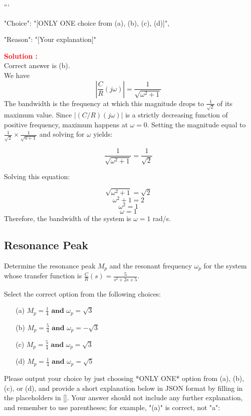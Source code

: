 \documentclass[12pt]{article}
\begin{document}
```
{

"Choice": "[ONLY ONE choice from (a), (b), (c), (d)]",

"Reason": "[Your explanation]"

}


\textbf{\textcolor{red}{Solution :}} \\
Correct answer is (b).\\
We have
\begin{equation}
    \left|\frac{C}{R}(j\omega)\right| = \frac{1}{\sqrt{\omega^2+1}}
\end{equation}
The bandwidth is the frequency at which this magnitude drops to \(\frac{1}{\sqrt{2}}\) of its maximum value. Since  \(|(C/R)(j\omega)|\) is a strictly decreasing function of positive frequency,  maximum happens at \(\omega = 0\). Setting the magnitude equal to \(\frac{1}{\sqrt{2}} \times \frac{1}{\sqrt{0+1}} \) and solving for \(\omega\) yields:

\[ \frac{1}{\sqrt{\omega^2 + 1}} = \frac{1}{\sqrt{2}} \]

Solving this equation:

\[ \sqrt{\omega^2 + 1} = \sqrt{2} \]
\[ \omega^2 + 1 = 2 \]
\[ \omega^2 = 1 \]
\[ \omega = 1 \]
Therefore, the bandwidth of the system is \(\omega = 1\) rad/s.
\clearpage

\subsection{Resonance Peak}

Determine the resonance peak \(M_p\) and the resonant frequency \(\omega_p\) for the system whose transfer function is \(\frac{C}{R}(s) = \frac{5}{s^2 + 2s + 5}\).


Select the correct option from the following choices:
\begin{enumerate}
    \item [(a)] \( M_p=\frac{1}{4} \textbf{ and } \omega_p= \sqrt{3} \)
    \item [(b)] \( M_p= \frac{5}{4} \textbf{ and } \omega_p= -\sqrt{3} \)
    \item [(c)]  \( M_p= \frac{5}{4} \textbf{ and } \omega_p= \sqrt{3} \)
    \item [(d)]  \( M_p= \frac{1}{4} \textbf{ and } \omega_p= \sqrt{5} \)
\end{enumerate}

Please output your choice by just choosing *ONLY ONE* option from (a), (b), (c), or (d), and provide a short explanation below in JSON format by filling in the placeholders in []. Your answer should not include any further explanation, and remember to use parentheses; for example, "(a)" is correct, not "a": 
\end{document}
